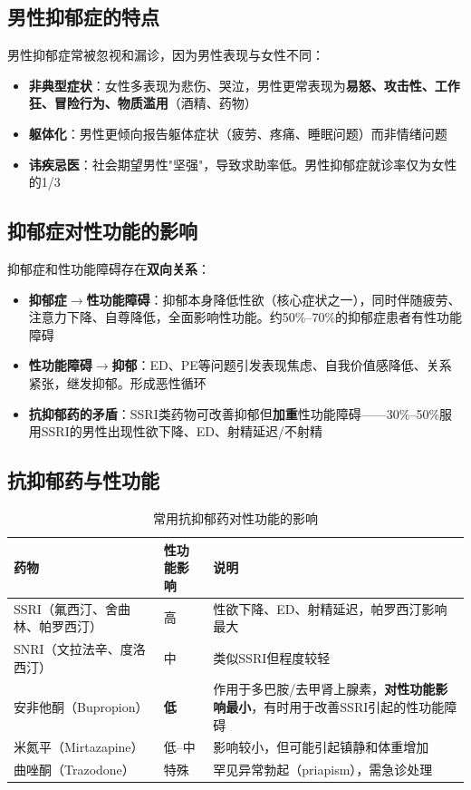 \subsection{男性抑郁症的特点}

男性抑郁症常被忽视和漏诊，因为男性表现与女性不同：

\begin{itemize}[leftmargin=2cm]
	\item \textbf{非典型症状}：女性多表现为悲伤、哭泣，男性更常表现为\textbf{易怒、攻击性、工作狂、冒险行为、物质滥用}（酒精、药物）
	\item \textbf{躯体化}：男性更倾向报告躯体症状（疲劳、疼痛、睡眠问题）而非情绪问题
	\item \textbf{讳疾忌医}：社会期望男性"坚强"，导致求助率低。男性抑郁症就诊率仅为女性的1/3
\end{itemize}

\subsection{抑郁症对性功能的影响}

抑郁症和性功能障碍存在\textbf{双向关系}：

\begin{itemize}[leftmargin=2cm]
	\item \textbf{抑郁症$\rightarrow$性功能障碍}：抑郁本身降低性欲（核心症状之一），同时伴随疲劳、注意力下降、自尊降低，全面影响性功能。约50\%--70\%的抑郁症患者有性功能障碍
	\item \textbf{性功能障碍$\rightarrow$抑郁}：ED、PE等问题引发表现焦虑、自我价值感降低、关系紧张，继发抑郁。形成恶性循环
	\item \textbf{抗抑郁药的矛盾}：SSRI类药物可改善抑郁但\textbf{加重}性功能障碍——30\%--50\%服用SSRI的男性出现性欲下降、ED、射精延迟/不射精
\end{itemize}

\subsection{抗抑郁药与性功能}

\begin{table}[htbp]
\centering
\caption{常用抗抑郁药对性功能的影响}
\label{tab:antidepressants_sexual}
\begin{tabularx}{\textwidth}{@{}llX@{}}
    \toprule
    \textbf{药物} & \textbf{性功能影响} & \textbf{说明} \\
    \midrule
    SSRI（氟西汀、舍曲林、帕罗西汀） & 高 & 性欲下降、ED、射精延迟，帕罗西汀影响最大 \\
    SNRI（文拉法辛、度洛西汀） & 中 & 类似SSRI但程度较轻 \\
    安非他酮（Bupropion） & \textbf{低} & 作用于多巴胺/去甲肾上腺素，\textbf{对性功能影响最小}，有时用于改善SSRI引起的性功能障碍 \\
    米氮平（Mirtazapine） & 低--中 & 影响较小，但可能引起镇静和体重增加 \\
    曲唑酮（Trazodone） & 特殊 & 罕见异常勃起（priapism），需急诊处理 \\
    \bottomrule
\end{tabularx}
\end{table}

